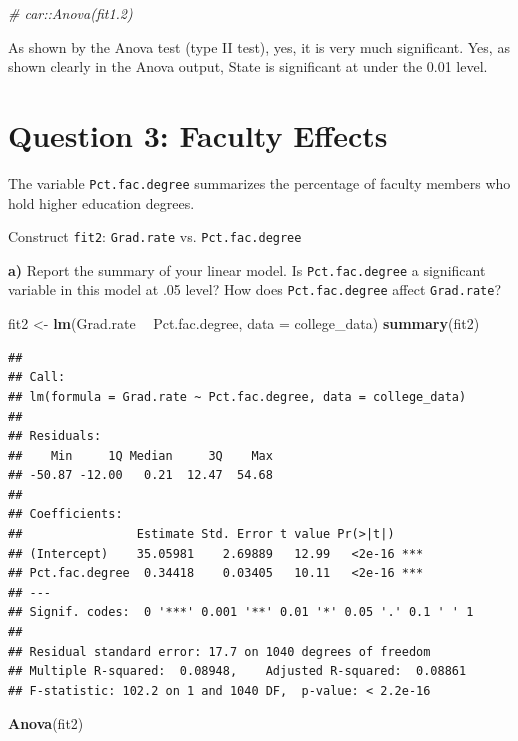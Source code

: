 \documentclass[]{article}
\newenvironment{Shaded}{\begin{snugshade}}{\end{snugshade}}
\newcommand{\KeywordTok}[1]{\textcolor[rgb]{0.13,0.29,0.53}{\textbf{#1}}}
\newcommand{\DataTypeTok}[1]{\textcolor[rgb]{0.13,0.29,0.53}{#1}}
\newcommand{\StringTok}[1]{\textcolor[rgb]{0.31,0.60,0.02}{#1}}
\newcommand{\CommentTok}[1]{\textcolor[rgb]{0.56,0.35,0.01}{\textit{#1}}}
\newcommand{\OperatorTok}[1]{\textcolor[rgb]{0.81,0.36,0.00}{\textbf{#1}}}
\newcommand{\NormalTok}[1]{#1}
\begin{document}
\begin{Shaded}
\begin{Highlighting}[]
\CommentTok{# car::Anova(fit1.2)}
\end{Highlighting}
\end{Shaded}

As shown by the Anova test (type II test), yes, it is very much
significant. Yes, as shown clearly in the Anova output, State is
significant at under the 0.01 level.

\section{Question 3: Faculty Effects}\label{question-3-faculty-effects}

The variable \texttt{Pct.fac.degree} summarizes the percentage of
faculty members who hold higher education degrees.

Construct \texttt{fit2}: \texttt{Grad.rate} vs. \texttt{Pct.fac.degree}

\textbf{a)} Report the summary of your linear model. Is
\texttt{Pct.fac.degree} a significant variable in this model at .05
level? How does \texttt{Pct.fac.degree} affect \texttt{Grad.rate}?

\begin{Shaded}
\begin{Highlighting}[]
\NormalTok{fit2 <-}\StringTok{ }\KeywordTok{lm}\NormalTok{(Grad.rate }\OperatorTok{~}\StringTok{ }\NormalTok{Pct.fac.degree, }\DataTypeTok{data =}\NormalTok{ college_data)}
\KeywordTok{summary}\NormalTok{(fit2)}
\end{Highlighting}
\end{Shaded}

\begin{verbatim}
## 
## Call:
## lm(formula = Grad.rate ~ Pct.fac.degree, data = college_data)
## 
## Residuals:
##    Min     1Q Median     3Q    Max 
## -50.87 -12.00   0.21  12.47  54.68 
## 
## Coefficients:
##                Estimate Std. Error t value Pr(>|t|)    
## (Intercept)    35.05981    2.69889   12.99   <2e-16 ***
## Pct.fac.degree  0.34418    0.03405   10.11   <2e-16 ***
## ---
## Signif. codes:  0 '***' 0.001 '**' 0.01 '*' 0.05 '.' 0.1 ' ' 1
## 
## Residual standard error: 17.7 on 1040 degrees of freedom
## Multiple R-squared:  0.08948,    Adjusted R-squared:  0.08861 
## F-statistic: 102.2 on 1 and 1040 DF,  p-value: < 2.2e-16
\end{verbatim}

\begin{Shaded}
\begin{Highlighting}[]
\KeywordTok{Anova}\NormalTok{(fit2)}
\end{Highlighting}
\end{Shaded}
\end{document}
